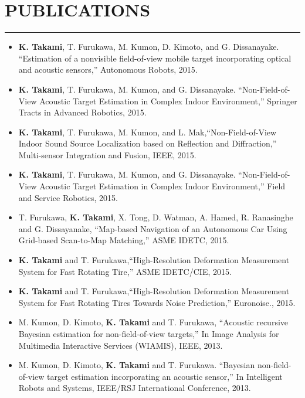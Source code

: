 \documentclass[11pt,letterpaper]{article}
\begin{document}
\section*{PUBLICATIONS}\vspace{-3mm}
\hrule
\begin{itemize}[label={}]
\item {\bf K. Takami}, T. Furukawa, M. Kumon, D. Kimoto, and G. Dissanayake. ``Estimation of a nonvisible field-of-view mobile target incorporating optical and acoustic sensors,'' Autonomous Robots, 2015.

\item {\bf K. Takami}, T. Furukawa, M. Kumon, and G. Dissanayake. ``Non-Field-of-View Acoustic Target Estimation in Complex Indoor Environment,'' Springer Tracts in Advanced Robotics, 2015.

\item  {\bf K. Takami}, T. Furukawa, M. Kumon, and L. Mak,``Non-Field-of-View Indoor Sound Source Localization based on Reflection and Diffraction,'' Multi-sensor Integration and Fusion, IEEE, 2015.

\item {\bf K. Takami}, T. Furukawa, M. Kumon, and G. Dissanayake. ``Non-Field-of-View Acoustic Target Estimation in Complex Indoor Environment,'' Field and Service Robotics, 2015.

\item  T. Furukawa, {\bf K. Takami}, X. Tong, D. Watman, A. Hamed, R. Ranasinghe and G. Dissayanake, ``Map-based Navigation of an Autonomous Car Using Grid-based Scan-to-Map Matching,'' ASME IDETC, 2015.

\item  {\bf K. Takami} and T. Furukawa,``High-Resolution Deformation Measurement System for Fast Rotating Tire,'' ASME IDETC/CIE, 2015.


\item  {\bf K. Takami} and T. Furukawa,``High-Resolution Deformation Measurement System for Fast Rotating Tires Towards Noise Prediction,'' Euronoise., 2015.

\item M. Kumon, D. Kimoto, {\bf K. Takami} and T. Furukawa, ``Acoustic recursive Bayesian estimation for non-field-of-view targets,'' In Image Analysis for Multimedia Interactive Services (WIAMIS), IEEE, 2013.

\item M. Kumon, D. Kimoto, {\bf K. Takami} and T. Furukawa. ``Bayesian non-field-of-view target estimation incorporating an acoustic sensor,'' In Intelligent Robots and Systems, IEEE/RSJ International Conference, 2013.


\end{itemize}
\end{document}
